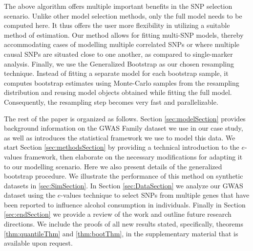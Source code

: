 The above algorithm offers multiple important benefits in the SNP selection scenario. Unlike other model selection methods, only the full model needs to be computed here. It thus offers the user more flexibility in utilizing a suitable method of estimation. Our method allows for fitting multi-SNP models, thereby accommodating cases of modelling multiple correlated SNPs or where multiple causal SNPs are situated close to one another, as compared to single-marker analysis. Finally, we use the Generalized Bootstrap \citep{ChatterjeeBose05} as our chosen resampling technique. Instead of fitting a separate model for each bootstrap sample, it computes bootstrap estimates using Monte-Carlo samples from the resampling distribution and reusing model objects obtained while fitting the full model. Consequently, the resampling step becomes very fast and parallelizable.

The rest of the paper is organized as follows. Section \ref{sec:modelSection} provides background information on the GWAS Family dataset we use in our case study, as well as introduces the statistical framework we use to model this data. We start Section \ref{sec:methodsSection} by providing a technical introduction to the $e$-values framework, then elaborate on the necessary modifications for adapting it to our modelling scenario. Here we also present details of the generalized bootstrap procedure. We illustrate the performance of this method on synthetic datasets in \ref{sec:SimSection}. In Section \ref{sec:DataSection} we analyze our GWAS dataset using the $e$-values technique to select SNPs from multiple genes that have been reported to influence alcohol consumption in individuals. Finally in Section \ref{sec:endSection} we provide a review of the work and outline future research directions. We include the proofs of all new results stated, specifically, theorems \ref{thm:quantileThm} and \ref{thm:bootThm}, in the supplementary material that is available upon request.